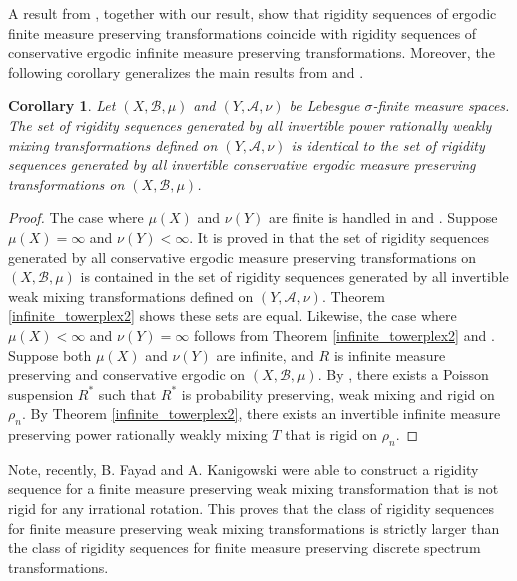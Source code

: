 \documentclass[12pt]{amsart}
\newtheorem{corollary}[theorem]{Corollary}
\begin{document}
\noindent 
A result from \cite{Roy09}, together with our result, 
show that rigidity sequences of ergodic finite measure 
preserving transformations coincide with rigidity 
sequences of conservative ergodic infinite measure 
preserving transformations. 
Moreover, the following corollary generalizes 
the main results from \cite{Towerplex1} and \cite{FayTho14}. 
\begin{corollary}
\label{inf-to-inf}
Let $(X,\mathcal{B},\mu)$ and $(Y,\mathcal{A},\nu)$ 
be Lebesgue $\sigma$-finite measure spaces. 
The set of rigidity sequences generated by all invertible 
{\it power} rationally weakly mixing transformations 
defined on $(Y,\mathcal{A},\nu)$
is identical to the set of rigidity sequences generated 
by all invertible conservative ergodic measure preserving 
transformations on $(X,\mathcal{B},\mu)$. 
\end{corollary}
\begin{proof}
The case where $\mu(X)$ and $\nu(Y)$ are finite 
is handled in \cite{Towerplex1} and \cite{FayTho14}. 
Suppose $\mu(X)=\infty$ and $\nu(Y)<\infty$. 
It is proved in \cite{Roy09} that the set 
of rigidity sequences generated by all conservative 
ergodic measure preserving transformations 
on $(X,\mathcal{B},\mu)$ is contained in the set 
of rigidity sequences generated by all invertible 
weak mixing transformations defined on $(Y,\mathcal{A},\nu)$. 
Theorem \ref{infinite_towerplex2} shows these sets are equal. 
Likewise, the case where $\mu(X)<\infty$ and $\nu(Y)=\infty$ 
follows from Theorem \ref{infinite_towerplex2} and \cite{Roy09}.  
Suppose both $\mu(X)$ and $\nu(Y)$ are infinite, and 
$R$ is infinite measure preserving and conservative ergodic 
on $(X,\mathcal{B},\mu)$.  By \cite{Roy09}, 
there exists a Poisson suspension $R^*$ such that 
$R^*$ is probability preserving, weak mixing and rigid on $\rho_n$. 
By Theorem \ref{infinite_towerplex2}, there exists an invertible 
infinite measure preserving power rationally weakly mixing 
$T$ that is rigid on $\rho_n$. 
\end{proof}

Note, recently, B. Fayad and A. Kanigowski  \cite{FayKan14} were able to construct a rigidity sequence 
for a finite measure preserving weak mixing transformation that is not rigid 
for any irrational rotation. This proves that the class of rigidity sequences for finite measure 
preserving weak mixing transformations is strictly larger than the class of rigidity sequences 
for finite measure preserving discrete spectrum transformations. 
\end{document}
